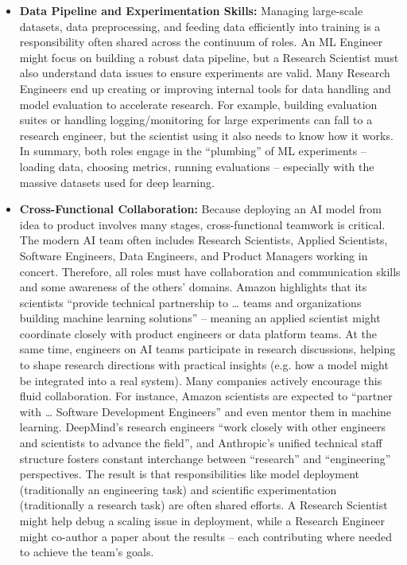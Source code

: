 \documentclass[pdflatex,sn-mathphys-num]{sn-jnl}%
\theoremstyle{thmstyleone}%
\theoremstyle{thmstyletwo}%
\theoremstyle{thmstylethree}%
\begin{document}
\begin{itemize}
\item \textbf{Data Pipeline and Experimentation Skills:} Managing large-scale datasets, data preprocessing, and feeding data efficiently into training is a responsibility often shared across the continuum of roles. An ML Engineer might focus on building a robust data pipeline, but a Research Scientist must also understand data issues to ensure experiments are valid. Many Research Engineers end up creating or improving internal tools for data handling and model evaluation to accelerate research. For example, building evaluation suites or handling logging/monitoring for large experiments can fall to a research engineer, but the scientist using it also needs to know how it works. In summary, both roles engage in the “plumbing” of ML experiments – loading data, choosing metrics, running evaluations – especially with the massive datasets used for deep learning. 

\item \textbf{Cross-Functional Collaboration:} Because deploying an AI model from idea to product involves many stages, cross-functional teamwork is critical. The modern AI team often includes Research Scientists, Applied Scientists, Software Engineers, Data Engineers, and Product Managers working in concert. Therefore, all roles must have collaboration and communication skills and some awareness of the others’ domains. Amazon highlights that its scientists “provide technical partnership to … teams and organizations building machine learning solutions” – meaning an applied scientist might coordinate closely with product engineers or data platform teams. At the same time, engineers on AI teams participate in research discussions, helping to shape research directions with practical insights (e.g. how a model might be integrated into a real system). Many companies actively encourage this fluid collaboration. For instance, Amazon scientists are expected to “partner with … Software Development Engineers” and even mentor them in machine learning. DeepMind’s research engineers “work closely with other engineers and scientists to advance the field”\cite{DeepMind-RE-2025}, and Anthropic’s unified technical staff structure fosters constant interchange between “research” and “engineering” perspectives. The result is that responsibilities like model deployment (traditionally an engineering task) and scientific experimentation (traditionally a research task) are often shared efforts. A Research Scientist might help debug a scaling issue in deployment, while a Research Engineer might co-author a paper about the results – each contributing where needed to achieve the team’s goals. 


\end{itemize}
\end{document}
